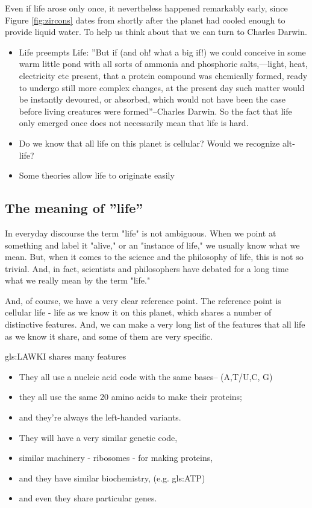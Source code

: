 \documentclass[]{article}
\begin{document}
 Even if life arose only once, it nevertheless happened remarkably early, since Figure \ref{fig:zircons} dates from shortly after the planet had cooled enough to provide liquid water. To help us think about that we can turn to Charles Darwin.
\begin{itemize}
	\item Life preempts Life: ''But if (and oh! what a big if!) we could conceive in some warm little pond with all sorts of ammonia and phosphoric salts,—light, heat, electricity etc present, that a protein compound was chemically formed, ready to undergo still more complex changes, at the present day such matter would be instantly devoured, or absorbed, which would not have been the case before living creatures were formed''--Charles Darwin\cite{darwin1871letter}. So the fact that life only emerged once does not necessarily mean that life is hard.
	
	\item Do we know that all life on this planet is cellular? Would we recognize alt-life?
	
	\item Some theories allow life to originate easily\cite{wachtershauser1988before}
\end{itemize}

\subsection{The meaning of ''life''}
In everyday discourse the term "life" is not ambiguous.
When we point at something and label it "alive,"
or an "instance of life," we usually know what we mean.
But, when it comes to the science and the philosophy of life,
this is not so trivial.
And, in fact,
scientists and philosophers
have debated for a long time
what we really mean by the term "life."

And, of course, we have
a very clear reference point.
The reference point is cellular life -
life as we know it on this planet,
which shares a number
of distinctive features.
And, we can make a very long list
of the features
that all life as we know it share,
and some of them are very specific.

\gls{gls:LAWKI} shares many features
\begin{itemize}
	\item They all use a nucleic acid code 	with the same bases-- (A,T/U,C, G)
	\item they all use the same 20 amino acids
	to make their proteins;
	\item and they're always
	the left-handed variants.
	\item They will have a very similar
	genetic code,
	\item similar machinery - ribosomes -
	for making proteins,
	\item and they have similar biochemistry, (e.g. \gls{gls:ATP})
	\item and even they share particular genes.
\end{itemize}
\end{document}
